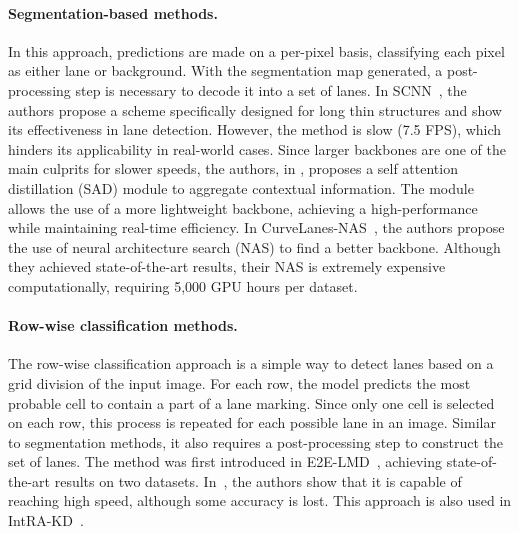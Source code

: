 \documentclass[final]{cvpr}
\begin{document}
\paragraph{Segmentation-based methods.}
In this approach, predictions are made on a per-pixel basis, classifying each pixel as either lane or background. With the segmentation map generated, a post-processing step is necessary to decode it into a set of lanes. In SCNN~\cite{scnn}, the authors propose a scheme specifically designed for long thin structures and show its effectiveness in lane detection. However, the method is slow (7.5 FPS), which hinders its applicability in real-world cases. Since larger backbones are one of the main culprits for slower speeds, the authors, in \cite{enet-sad}, proposes a self attention distillation (SAD) module to aggregate contextual information. The module allows the use of a more lightweight backbone, achieving a high-performance while maintaining real-time efficiency. In CurveLanes-NAS~\cite{curvelane-nas}, the authors propose the use of neural architecture search (NAS) to find a better backbone. Although they achieved state-of-the-art results, their NAS is extremely expensive computationally, requiring 5{,}000 GPU hours per dataset.

\paragraph{Row-wise classification methods.}
The row-wise classification approach is a simple way to detect lanes based on a grid division of the input image. For each row, the model predicts the most probable cell to contain a part of a lane marking. Since only one cell is selected on each row, this process is repeated for each possible lane in an image. Similar to segmentation methods, it also requires a post-processing step to construct the set of lanes. The method was first introduced in E2E-LMD~\cite{e2e-lmd}, achieving state-of-the-art results on two datasets. In~\cite{ufsa}, the authors show that it is capable of reaching high speed, although some accuracy is lost. This approach is also used in IntRA-KD~\cite{intrakd}.
\end{document}
